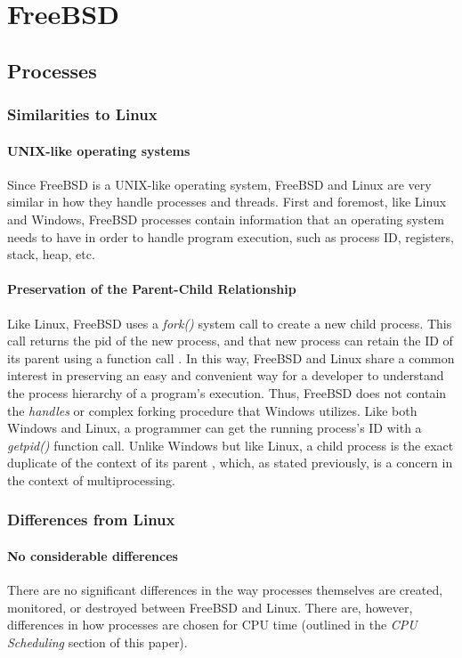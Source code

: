 \documentclass[letterpaper,10pt,titlepage]{article}
\begin{document}
\section{FreeBSD}
\subsection{Processes}
\subsubsection{Similarities to Linux}
\paragraph{UNIX-like operating systems}
Since FreeBSD is a UNIX-like operating system, FreeBSD and Linux are very similar in how they handle processes and threads. First and foremost, like Linux and Windows, FreeBSD processes contain information that an operating system needs to have in order to handle program execution, such as process ID, registers, stack, heap, etc. 
\paragraph{Preservation of the Parent-Child Relationship} 
Like Linux, FreeBSD uses a \emph{fork()} system call to create a new child process. This call returns the pid of the new process, and that new process can retain the ID of its parent using a function call \cite{mck15}. In this way, FreeBSD and Linux share a common interest in preserving an easy and convenient way for a developer to understand the process hierarchy of a program's execution. Thus, FreeBSD does not contain the \emph{handles} or complex forking procedure that Windows utilizes. Like both Windows and Linux, a programmer can get the running process's ID with a \emph{getpid()} function call. Unlike Windows but like Linux, a child process is the exact duplicate of the context of its parent \cite{mck15}, which, as stated previously, is a concern in the context of multiprocessing.
\subsubsection{Differences from Linux}
\paragraph{No considerable differences} There are no significant differences in the way processes themselves are created, monitored, or destroyed between FreeBSD and Linux. There are, however, differences in how processes are chosen for CPU time (outlined in the \emph{CPU Scheduling} section of this paper).
\end{document}
